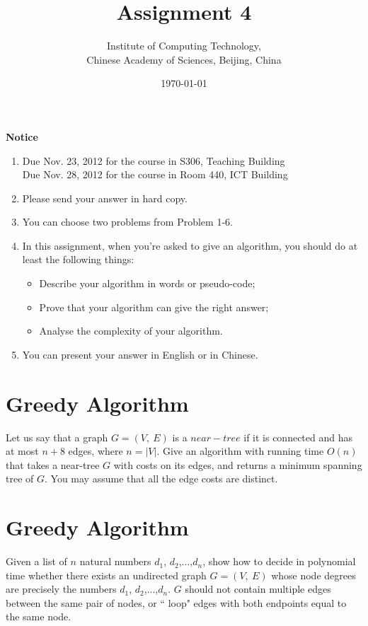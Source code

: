 \documentclass[a4paper,10pt]{article}
\title{Assignment 4}
\author{Institute of Computing Technology, \\
                       Chinese Academy of Sciences, Beijing, China }
\date{\today}
\begin{document}
\maketitle



\textbf{Notice}

\begin{enumerate}
\item  Due Nov. 23, 2012 for the course in S306, Teaching Building\\
Due Nov. 28, 2012 for the course in Room 440, ICT Building\\
\item  Please send your answer in hard copy.\\
\item  You can choose two problems from Problem 1-6.\\
\item In this assignment, when you're asked to give an algorithm, you should do at least the following things:

      \begin{itemize}
      \item Describe your algorithm in words or pseudo-code;
      \item Prove that your algorithm can give the right answer;
      \item Analyse the complexity of your algorithm.
      \end{itemize}
     \item  You can present your answer in English or in Chinese.
\end{enumerate}

\section{Greedy Algorithm}
Let us say that a graph $G=(V,\ E)$ is a $near-tree$ if it is connected and has at most $n+8$ edges, where $n=|V|$. Give an algorithm with running time $O(n)$ that takes a near-tree $G$ with costs on its edges, and returns a minimum spanning tree of $G$. You may assume that all the edge costs are distinct.

\section{Greedy Algorithm}
Given a list of $n$ natural numbers $d_1$, $d_2$,...,$d_n$, show how to decide in polynomial time whether there exists an undirected graph $G=(V,\ E)$ whose node degrees are precisely the numbers $d_1$, $d_2$,...,$d_n$. $G$ should not contain multiple edges between the same pair of nodes, or `` loop" edges with both endpoints equal to the same node.
\end{document}
